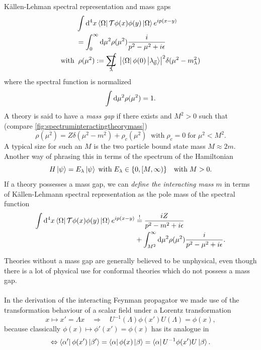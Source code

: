 \begin{mybox}{Källen-Lehman spectral representation and mass gaps}
	\begin{align}
		&\int \md^4 x \bra{\Omega}\mathcal{T} \phi(x) \phi(y) \ket{\Omega} e^{ip(x-y)} \\
		&= \int_0^\infty \md \mu^2 \rho( \mu^2) \frac{i}{p^2-\mu^2+i\epsilon}\nonumber \\
		\mathrm{with}\; &\;\rho(\mu^2) := \sum_\lambda \hspace{-0.4cm}\int \; \abs{\bra{\Omega} \phi(0) \ket{\lambda_{\vec{0}}}}^2\delta(\mu^2-m^2_\lambda)
	\end{align}
where the spectral function is normalized
\begin{equation}
	\int \mathrm{d} \mu^2 \rho(\mu^2) =1.
\end{equation}
A theory is said to have a \emph{mass gap} if there exists and $ M^2>0$ such that (compare \ref{fig:spectruminteractingtheorymass})
\begin{equation}
\label{eq:massgap}
\rho(\mu^2) = Z \delta(\mu^2-m^2) + \rho_c(\mu^2) \;\; \mathrm{with}\; \rho_c=0 \;\mathrm{for} \; \mu^2 < M^2.
\end{equation}
A typical size for such an $M$ is the two particle bound state mass $M\approx 2m$. Another way of phrasing this in terms of the spectrum of the Hamiltonian
\begin{equation}
	H \ket{\psi} = E_\lambda \ket{\psi}\; \mathrm{with}\; E_\lambda \in \{0,[M,\infty) \} \quad \mathrm{with}\; M>0.
\end{equation}
If a theory possesses a mass gap, we can \emph{define the interacting mass} $m$ in terms of Källen-Lehmann spectral representation as the pole mass of the spectral function
\begin{align}
	\label{eq:polemassKLrep}
	\int \mathrm{d}^4x\bra{\Omega}\mathcal{T}\phi(x) \phi(y) \ket{\Omega}e^{ip(x-y)} &\stackrel{!}{=} \frac{iZ}{p^2-m^2+i \epsilon} \\
	&+ \int_{M^2}^\infty \mathrm{d} \mu^2\rho(\mu^2) \frac{i}{p^2-\mu^2+i\epsilon}.
\end{align}
\end{mybox}
Theories without a mass gap are generally believed to be unphysical, even though there is a lot of physical use for conformal theories which do not possess a mass gap.\\
\\
In the derivation of the interacting Feynman propagator we made use of the transformation behaviour of a scalar field under a Lorentz transformation
\begin{equation}
	x \mapsto x'=\Lambda x \quad \Rightarrow \quad U^{-1}(\Lambda)\phi(x') U(\Lambda) = \phi(x),
\end{equation}
because classically $\phi(x) \mapsto \phi'(x')=\phi(x)$ has its analogue in 
\begin{equation}
	\Leftrightarrow \bra{\alpha'} \phi(x') \ket{\beta'} = \bra{\alpha} \phi(x)\ket{\beta}=\bra{\alpha}U^{-1} \phi(x')U\ket{\beta}.
\end{equation}

